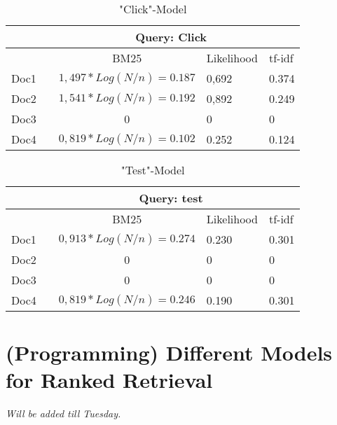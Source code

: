 \documentclass{scrartcl}
\begin{document}
\begin{table}[h]
\centering
\caption{"Click"-Model}
\label{click-model}
\begin{tabular}{|l|c|c|l|l|l|l|}
\hline
     & \multicolumn{6}{c|}{Query: Click}                                                           \\ \hline
     &  & BM25                     & \multicolumn{2}{l|}{Likelihood} & \multicolumn{2}{l|}{tf-idf} \\ \hline
Doc1 &  & $1,497* Log(N/n) = 0.187$  & \multicolumn{2}{l|}{0,692}      & \multicolumn{2}{l|}{0.374}  \\ \hline
Doc2 &  & $1,541* Log(N/n) = 0.192$  & \multicolumn{2}{l|}{0,892}      & \multicolumn{2}{l|}{0.249}  \\ \hline
Doc3 &  & 0                        & \multicolumn{2}{l|}{0}          & \multicolumn{2}{l|}{0}      \\ \hline
Doc4 &  & $0,819 *Log(N/n) = 0.102$ & \multicolumn{2}{l|}{0.252}      & \multicolumn{2}{l|}{0.124}  \\ \hline
\end{tabular}
\end{table}

\begin{table}[h]
\centering
\caption{"Test"-Model}
\label{test-model}
\begin{tabular}{|l|c|c|l|l|l|l|}
\hline
     & \multicolumn{6}{c|}{Query: test}                                                            \\ \hline
     &  & BM25                     & \multicolumn{2}{l|}{Likelihood} & \multicolumn{2}{l|}{tf-idf} \\ \hline
Doc1 &  & $0,913* Log(N/n) = 0.274$  & \multicolumn{2}{l|}{0.230}      & \multicolumn{2}{l|}{0.301}  \\ \hline
Doc2 &  & 0                        & \multicolumn{2}{l|}{0}          & \multicolumn{2}{l|}{0}      \\ \hline
Doc3 &  & 0                        & \multicolumn{2}{l|}{0}          & \multicolumn{2}{l|}{0}      \\ \hline
Doc4 &  & $0,819 * Log(N/n) = 0.246$ & \multicolumn{2}{l|}{0.190}      & \multicolumn{2}{l|}{0.301}  \\ \hline
\end{tabular}
\end{table}


\section{(Programming)  Different Models for Ranked Retrieval
}

\textit{Will be added till Tuesday.}
\end{document}
